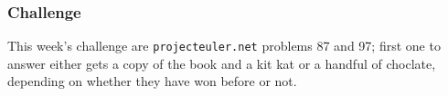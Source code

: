 \documentclass[12pt]{article}
\begin{document}
\subsubsection*{Challenge}
This week's challenge are \texttt{projecteuler.net} problems 87 and 97; first one to answer either gets a copy of the book and a kit kat or a handful of choclate, depending on whether they have won before or not.
\end{document}
